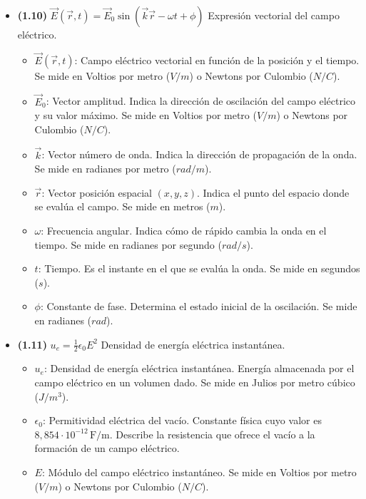 \documentclass{article}
\begin{document}
\begin{itemize}
				\item \textbf{(1.10)} $\boxed{\vec{E}(\vec{r},t)=\vec{E}_{0}\sin(\vec{k}\vec{r}-\omega t+\phi)}$ Expresión vectorial del campo eléctrico.
					\begin{itemize}
						\item $\vec{E}(\vec{r},t)$: Campo eléctrico vectorial en función de la posición y el tiempo. Se mide en Voltios por metro ($V/m$) o Newtons por Culombio ($N/C$).
						\item $\vec{E}_0$: Vector amplitud. Indica la dirección de oscilación del campo eléctrico y su valor máximo. Se mide en Voltios por metro ($V/m$) o Newtons por Culombio ($N/C$).
						\item $\vec{k}$: Vector número de onda. Indica la dirección de propagación de la onda. Se mide en radianes por metro ($rad/m$).
						\item $\vec{r}$: Vector posición espacial $(x,y,z)$. Indica el punto del espacio donde se evalúa el campo. Se mide en metros ($m$).
						\item $\omega$: Frecuencia angular. Indica cómo de rápido cambia la onda en el tiempo. Se mide en radianes por segundo ($rad/s$).
						\item $t$: Tiempo. Es el instante en el que se evalúa la onda. Se mide en segundos ($s$).
						\item $\phi$: Constante de fase. Determina el estado inicial de la oscilación. Se mide en radianes ($rad$).
					\end{itemize}

				\item \textbf{(1.11)} $\boxed{u_{e}=\frac{1}{2}\epsilon_{0}E^{2}}$ Densidad de energía eléctrica instantánea.
					\begin{itemize}
						\item $u_e$: Densidad de energía eléctrica instantánea. Energía almacenada por el campo eléctrico en un volumen dado. Se mide en Julios por metro cúbico ($J/m^3$).
						\item $\epsilon_{0}$: Permitividad eléctrica del vacío. Constante física cuyo valor es $8,854\cdot10^{-12}\,\text{F/m}$. Describe la resistencia que ofrece el vacío a la formación de un campo eléctrico.
						\item $E$: Módulo del campo eléctrico instantáneo. Se mide en Voltios por metro ($V/m$) o Newtons por Culombio ($N/C$).
					\end{itemize}


\end{itemize}
\end{document}
